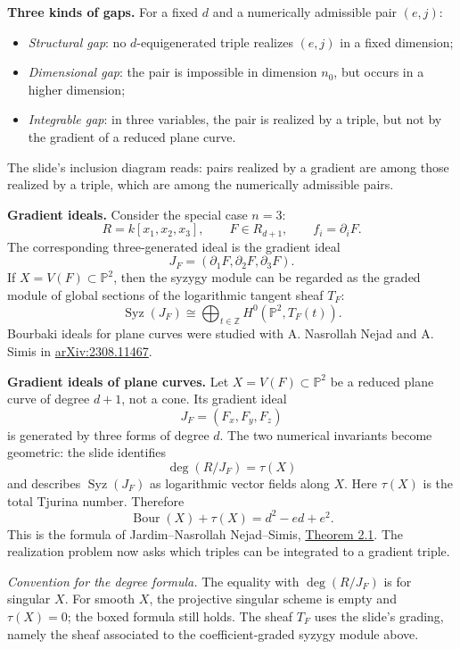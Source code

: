 \medskip\noindent
\textbf{Three kinds of gaps.}
For a fixed $d$ and a numerically admissible
pair $(e,j)$:
\begin{itemize}
\item \emph{Structural gap}: no
$d$-equigenerated triple realizes $(e,j)$
in a fixed dimension;
\item \emph{Dimensional gap}: the pair is
impossible in dimension $n_0$, but occurs
in a higher dimension;
\item \emph{Integrable gap}: in three
variables, the pair is realized by a
triple, but not by the gradient of a
reduced plane curve.
\end{itemize}
The slide's inclusion diagram reads:
pairs realized by a gradient are among
those realized by a triple, which are
among the numerically admissible pairs.

\medskip\noindent
\textbf{Gradient ideals.}
Consider the special case $n=3$:
$$
R=k[x_1,x_2,x_3],\qquad F\in R_{d+1},
\qquad f_i=\partial_iF.
$$
The corresponding three-generated ideal
is the gradient ideal
$$
J_F=(\partial_1F,\partial_2F,\partial_3F).
$$
If $X=V(F)\subset\mathbb{P}^2$, then
the syzygy module can be regarded as the
graded module of global sections of the
logarithmic tangent sheaf $T_F$:
$$
\operatorname{Syz}(J_F)\cong
\bigoplus_{t\in\mathbb{Z}}
H^0(\mathbb{P}^2,T_F(t)).
$$
Bourbaki ideals for plane curves were
studied with A. Nasrollah Nejad and
A. Simis in
\href{https://arxiv.org/abs/2308.11467}
{arXiv:2308.11467}.

\medskip\noindent
\textbf{Gradient ideals of plane curves.}
Let $X=V(F)\subset\mathbb{P}^2$ be a
reduced plane curve of degree $d+1$, not
a cone. Its gradient ideal
$$
J_F=(F_x,F_y,F_z)
$$
is generated by three forms of degree $d$.
The two numerical invariants become
geometric: the slide identifies
$$
\deg(R/J_F)=\tau(X)
$$
and describes $\operatorname{Syz}(J_F)$
as logarithmic vector fields along $X$.
Here $\tau(X)$ is the total Tjurina number.
Therefore
$$
\boxed{\operatorname{Bour}(X)+\tau(X)
=d^2-ed+e^2}.
$$
This is the formula of
Jardim--Nasrollah Nejad--Simis,
\href{https://arxiv.org/abs/2308.11467}
{Theorem 2.1}.
The realization problem now asks which
triples can be integrated to a gradient
triple.

\emph{Convention for the degree formula.}
The equality with $\deg(R/J_F)$ is for
singular $X$. For smooth $X$, the
projective singular scheme is empty and
$\tau(X)=0$; the boxed formula still holds.
The sheaf $T_F$ uses the slide's grading,
namely the sheaf associated to the
coefficient-graded syzygy module above.

